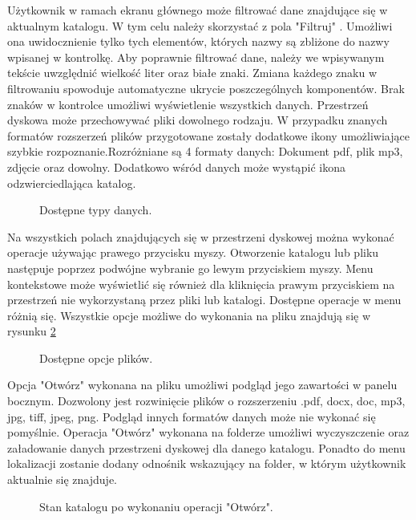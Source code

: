 Użytkownik w ramach ekranu głównego może filtrować dane znajdujące się w aktualnym katalogu. W tym celu należy skorzystać z pola "Filtruj" . Umożliwi ona uwidocznienie tylko tych elementów, których nazwy są zbliżone do nazwy wpisanej w kontrolkę. Aby poprawnie filtrować dane, należy we wpisywanym tekście uwzględnić wielkość liter oraz białe znaki. Zmiana każdego znaku w filtrowaniu spowoduje automatyczne ukrycie poszczególnych komponentów. Brak znaków w kontrolce umożliwi wyświetlenie wszystkich danych.
Przestrzeń dyskowa może przechowywać pliki dowolnego rodzaju. W przypadku znanych formatów rozszerzeń plików przygotowane zostały dodatkowe ikony umożliwiające szybkie rozpoznanie.Rozróżniane są 4 formaty danych: Dokument pdf, plik mp3, zdjęcie oraz dowolny. Dodatkowo wśród danych może wystąpić ikona odzwierciedlająca katalog. 

\begin{figure}[!h]
	\centering
	\caption{Dostępne typy danych.}
	\label{datatypes}
\end{figure}


Na wszystkich polach znajdujących się w przestrzeni dyskowej można wykonać operacje używając prawego przycisku myszy. Otworzenie katalogu lub pliku następuje poprzez podwójne wybranie go lewym przyciskiem myszy. Menu kontekstowe może wyświetlić się również dla kliknięcia prawym przyciskiem na przestrzeń nie wykorzystaną przez pliki lub katalogi. Dostępne operacje w menu różnią się. Wszystkie opcje możliwe do wykonania na pliku znajdują się w rysunku \ref{dostOpcje}
\begin{figure}[h!]
	\centering
	\caption{Dostępne opcje plików.}
	\label{dostOpcje}
\end{figure}

Opcja "Otwórz" wykonana na pliku umożliwi podgląd jego zawartości w panelu bocznym. Dozwolony jest rozwinięcie plików o rozszerzeniu .pdf, docx, doc, mp3, jpg, tiff, jpeg, png. Podgląd innych formatów danych może nie wykonać się pomyślnie.
Operacja "Otwórz" wykonana na folderze umożliwi wyczyszczenie oraz załadowanie danych przestrzeni dyskowej dla danego katalogu. Ponadto do menu lokalizacji zostanie dodany odnośnik wskazujący na folder, w którym użytkownik aktualnie się znajduje. 
\begin{figure}[h!]
	\centering
	\caption{Stan katalogu po wykonaniu operacji "Otwórz".}
	\label{openDirectory}
\end{figure}

